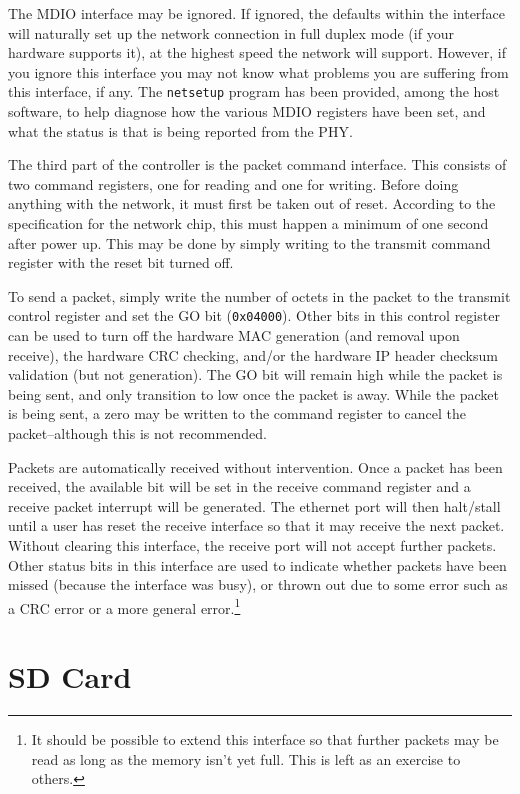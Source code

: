 \documentclass{gqtekspec}
\begin{document}
The MDIO interface may be ignored.  If ignored, the defaults within the
interface will naturally set up the network connection in full duplex mode (if
your hardware supports it), at the highest speed the network will support.  
However, if you ignore this interface you may not know what problems you are
suffering from this interface, if any.  The {\tt netsetup} program has been
provided, among the host software, to help diagnose how the various MDIO
registers have been set, and what the status is that is being reported from
the PHY.

The third part of the controller is the packet command interface.  This
consists of two command registers, one for reading and one for writing.
Before doing anything with the network, it must first be taken out of 
reset.  According to the specification for the network chip, this must
happen a minimum of one second after power up.  This may be done by simply
writing to the transmit command register with the reset bit turned off.

To send a packet, simply write the number of octets in the packet to the
transmit control register and set the GO bit ({\tt 0x04000}).  Other bits
in this control register can be used to turn off the hardware MAC generation
(and removal upon receive), the hardware CRC checking, and/or the hardware
IP header checksum validation (but not generation).  The GO bit will remain
high while the packet is being sent, and only transition to low once the
packet is away.  While the packet is being sent, a zero may be written to the
command register to cancel the packet--although this is not recommended.

Packets are automatically received without intervention.  Once a packet has been
received, the available bit will be set in the receive command register and
a receive packet interrupt will be generated.  The ethernet port will then
halt/stall until a user has reset the receive interface so that it may
receive the next packet.  Without clearing this interface, the receive port
will not accept further packets.  Other status bits in this interface are
used to indicate whether packets have been missed (because the interface was
busy), or thrown out due to some error such as a CRC error or a more general
error.\footnote{It should be possible to extend this interface so that further
packets may be read as long as the memory isn't yet full.  This is left as an
exercise to others.}

\section{SD Card}
\end{document}
